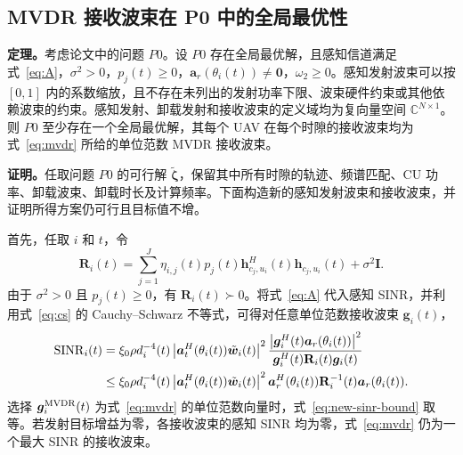 \documentclass[11pt,a4paper]{ctexart}
\begin{document}
\subsection{MVDR 接收波束在 P0 中的全局最优性}


\noindent\textbf{定理。}考虑论文中的问题 $P0$。设 $P0$ 存在全局最优解，且感知信道满足式~\eqref{eq:A}，$\sigma^2>0$，$p_j(t)\ge 0$，$\bm a_r(\theta_i(t))\ne\bm 0$，$\omega_2\ge 0$。感知发射波束可以按 $[0,1]$ 内的系数缩放，且不存在未列出的发射功率下限、波束硬件约束或其他依赖波束的约束。感知发射、卸载发射和接收波束的定义域均为复向量空间 $\mathbb C^{N\times1}$。
则 $P0$ 至少存在一个全局最优解，其每个 UAV 在每个时隙的接收波束均为式~\eqref{eq:mvdr} 所给的单位范数 MVDR 接收波束。

\medskip
\noindent\textbf{证明。}任取问题 $P0$ 的可行解 $\tilde{\bm\zeta}$，保留其中所有时隙的轨迹、频谱匹配、CU 功率、卸载波束、卸载时长及计算频率。下面构造新的感知发射波束和接收波束，并证明所得方案仍可行且目标值不增。

首先，任取 $i$ 和 $t$，令
\begin{equation}\label{eq:new-cov}
\mathbf R_i(t)=\sum_{j=1}^{J}\eta_{i,j}(t)p_j(t)
\bm h_{c_j,u_i}^{H}(t)\bm h_{c_j,u_i}(t)+\sigma^2\mathbf I.
\end{equation}
由于 $\sigma^2>0$ 且 $p_j(t)\ge0$，有 $\mathbf R_i(t)\succ0$。将式~\eqref{eq:A} 代入感知 SINR，并利用式~\eqref{eq:cs} 的 Cauchy--Schwarz 不等式，可得对任意单位范数接收波束 $\bm g_i(t)$，
\begin{align}\label{eq:new-sinr-bound}
\operatorname{SINR}_i(t)
&=\xi_0\rho d_i^{-4}(t)\left|\bm a_t^H(\theta_i(t))\tilde{\bm w}_i(t)\right|^2
\frac{\left|\bm g_i^H(t)\bm a_r(\theta_i(t))\right|^2}
{\bm g_i^H(t)\mathbf R_i(t)\bm g_i(t)}\notag\\
&\le\xi_0\rho d_i^{-4}(t)\left|\bm a_t^H(\theta_i(t))\tilde{\bm w}_i(t)\right|^2
\bm a_r^H(\theta_i(t))\mathbf R_i^{-1}(t)\bm a_r(\theta_i(t)).
\end{align}
选择 $\bm g_i^{\rm MVDR}(t)$ 为式~\eqref{eq:mvdr} 的单位范数向量时，式~\eqref{eq:new-sinr-bound} 取等。若发射目标增益为零，各接收波束的感知 SINR 均为零，式~\eqref{eq:mvdr} 仍为一个最大 SINR 的接收波束。
\end{document}
